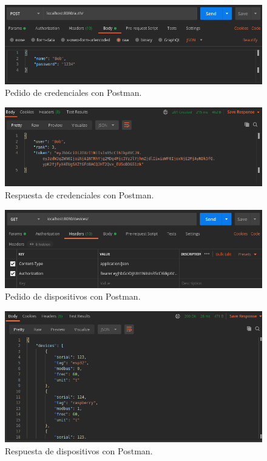 \begin{figure}[h]
	\centering
	\includegraphics[width=\textwidth]{./Figures/postman1.png}
	\caption{Pedido de credenciales con Postman.}
	\label{fig:ch4Postman1}
\end{figure}

\begin{figure}[h]
	\centering
	\includegraphics[width=\textwidth]{./Figures/postman2.png}
	\caption{Respuesta de credenciales con Postman.}
	\label{fig:ch4Postman2}
\end{figure}

\begin{figure}[h]
	\centering
	\includegraphics[width=\textwidth]{./Figures/postman3.png}
	\caption{Pedido de dispositivos con Postman.}
	\label{fig:ch4Postman3}
\end{figure}

\begin{figure}[h]
	\centering
	\includegraphics[width=\textwidth]{./Figures/postman4.png}
	\caption{Respuesta de dispositivos con Postman.}
	\label{fig:ch4Postman4}
\end{figure}

